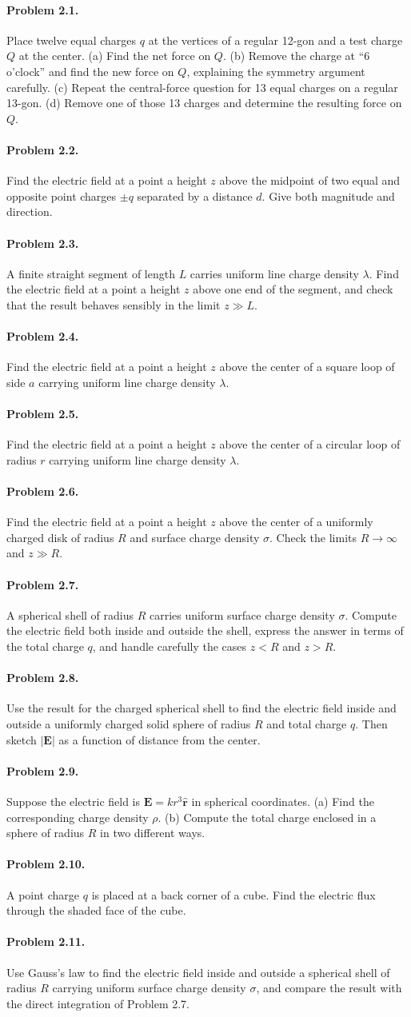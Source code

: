 \documentclass{aa}
\newcommand{\problemstatement}[2]{%
\paragraph{Problem #1.}#2\par\medskip
}
\begin{document}
\problemstatement{2.1}{Place twelve equal charges \(q\) at the vertices of a regular 12-gon and a test charge \(Q\) at the center. (a) Find the net force on \(Q\). (b) Remove the charge at ``6 o'clock'' and find the new force on \(Q\), explaining the symmetry argument carefully. (c) Repeat the central-force question for 13 equal charges on a regular 13-gon. (d) Remove one of those 13 charges and determine the resulting force on \(Q\).}
\problemstatement{2.2}{Find the electric field at a point a height \(z\) above the midpoint of two equal and opposite point charges \(\pm q\) separated by a distance \(d\). Give both magnitude and direction.}
\problemstatement{2.3}{A finite straight segment of length \(L\) carries uniform line charge density \(\lambda\). Find the electric field at a point a height \(z\) above one end of the segment, and check that the result behaves sensibly in the limit \(z\gg L\).}
\problemstatement{2.4}{Find the electric field at a point a height \(z\) above the center of a square loop of side \(a\) carrying uniform line charge density \(\lambda\).}
\problemstatement{2.5}{Find the electric field at a point a height \(z\) above the center of a circular loop of radius \(r\) carrying uniform line charge density \(\lambda\).}
\problemstatement{2.6}{Find the electric field at a point a height \(z\) above the center of a uniformly charged disk of radius \(R\) and surface charge density \(\sigma\). Check the limits \(R\to\infty\) and \(z\gg R\).}
\problemstatement{2.7}{A spherical shell of radius \(R\) carries uniform surface charge density \(\sigma\). Compute the electric field both inside and outside the shell, express the answer in terms of the total charge \(q\), and handle carefully the cases \(z<R\) and \(z>R\).}
\problemstatement{2.8}{Use the result for the charged spherical shell to find the electric field inside and outside a uniformly charged solid sphere of radius \(R\) and total charge \(q\). Then sketch \(|\mathbf E|\) as a function of distance from the center.}
\problemstatement{2.9}{Suppose the electric field is \(\mathbf E = k r^3 \hat{\mathbf r}\) in spherical coordinates. (a) Find the corresponding charge density \(\rho\). (b) Compute the total charge enclosed in a sphere of radius \(R\) in two different ways.}
\problemstatement{2.10}{A point charge \(q\) is placed at a back corner of a cube. Find the electric flux through the shaded face of the cube.}
\problemstatement{2.11}{Use Gauss's law to find the electric field inside and outside a spherical shell of radius \(R\) carrying uniform surface charge density \(\sigma\), and compare the result with the direct integration of Problem 2.7.}
\end{document}
